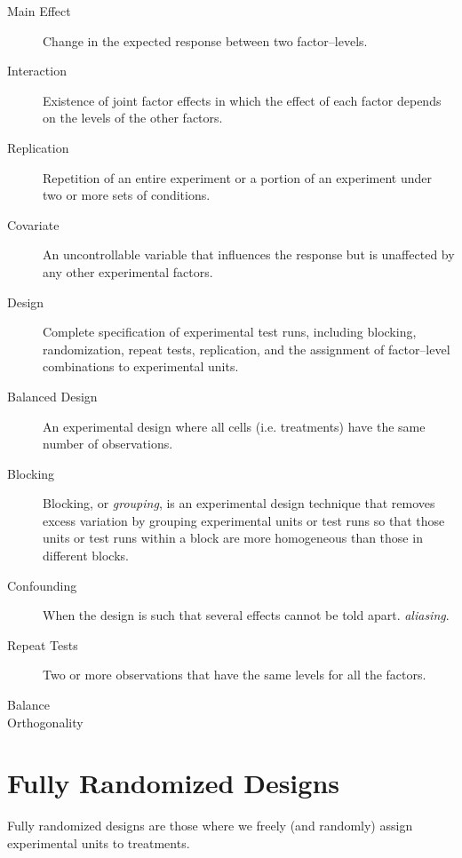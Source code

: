 \begin{description}
\item [Main Effect] Change in the expected response between two factor–levels.  

\item [Interaction] Existence of joint factor effects in which the effect of each factor depends on the levels of the other factors.

\item [Replication] Repetition of an entire experiment or a portion of an experiment under two or more sets of conditions.

\item [Covariate]  An uncontrollable variable that influences the response but is
unaffected by any other experimental factors.

\item [Design]  Complete specification of experimental test runs, including blocking, randomization, repeat tests, replication, and the assignment of factor–level combinations to experimental units.

\item [Balanced Design] An experimental design where all cells (i.e. treatments) have the same number of observations.

\item [Blocking]  Blocking, or \emph{grouping}, is an experimental design technique that removes excess variation by grouping experimental units or test runs so that those units or test runs within a block are more homogeneous than those in different blocks.

\item [Confounding] When the design is such that several effects cannot be told apart. \Aka \emph{aliasing}.

\item [Repeat Tests] Two or more observations that have the same levels for all the factors.

\item [Balance] 

\item [Orthogonality]
\end{description}







\section{Fully Randomized Designs}
Fully randomized designs are those where we freely (and randomly) assign experimental units to treatments.


